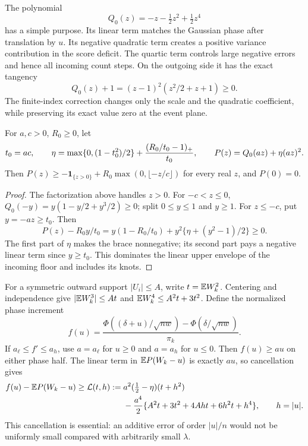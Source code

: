 The polynomial
\begin{equation}\label{dc:q0}
                  Q_0(z)=-z-\tfrac12z^2+\tfrac12z^4
\end{equation}
has a simple purpose. Its linear term matches the Gaussian phase after
translation by $u$. Its negative quadratic term creates a positive
variance contribution in the score deficit. The quartic term controls
large negative errors and hence all incoming count steps. On the outgoing
side it has the exact tangency
\[
 Q_0(z)+1=(z-1)^2(z^2/2+z+1)\ge0.
\]
The finite-index correction changes only the scale and the quadratic
coefficient, while preserving its exact value zero at the event plane.

\begin{lemma}\label{dc:explicit-majorant}
For $a,c>0$, $R_0\ge0$, let
\[
 t_0=ac,\qquad
 \eta=\max\{0,(1-t_0^2)/2\}
               +\frac{(R_0/t_0-1)_+}{t_0},\qquad
 P(z)=Q_0(az)+\eta(az)^2.
\]
Then $P(z)\ge-\mathbf1_{\{z>0\}}+R_0\max(0,\lfloor-z/c\rfloor)$
for every real $z$, and $P(0)=0$.
\end{lemma}
\begin{proof}
The factorization above handles $z>0$. For $-c<z\le0$,
$Q_0(-y)=y(1-y/2+y^3/2)\ge0$; split $0\le y\le1$ and $y\ge1$.
For $z\le-c$, put $y=-az\ge t_0$. Then
\[
 P(z)-R_0y/t_0
   =y(1-R_0/t_0)+y^2\{\eta+(y^2-1)/2\}\ge0.
\]
The first part of $\eta$ makes the brace nonnegative; its second part
pays a negative linear term since $y\ge t_0$. This dominates the linear
upper envelope of the incoming floor and includes its knots.
\end{proof}

For a symmetric outward support $|U_i|\le A$, write
$t=\mathbb E W_k^2$. Centering and independence give
$|\mathbb E W_k^3|\le At$ and $\mathbb E W_k^4\le A^2t+3t^2$.
Define the normalized phase increment
\[
 f(u)=\frac{\Phi((\delta+u)/\sqrt{nw})-\Phi(\delta/\sqrt{nw})}{\pi_k}.
\]
If $a_\ell\le f'\le a_h$, use $a=a_\ell$ for $u\ge0$ and
$a=a_h$ for $u\le0$. Then $f(u)\ge au$ on either phase half.
The linear term in $\mathbb E P(W_k-u)$ is exactly $au$, so cancellation gives
\begin{align}\label{dc:tail-loss}
 f(u)-\mathbb E P(W_k-u)\ge\mathcal L(t,h)
 :={}&a^2(\tfrac12-\eta)(t+h^2)\\
 &-\frac{a^4}{2}\{A^2t+3t^2+4Aht+6h^2t+h^4\},
 \qquad h=|u|.\notag
\end{align}
This cancellation is essential: an additive error of order $|u|/n$
would not be uniformly small compared with arbitrarily small $\lambda$.


